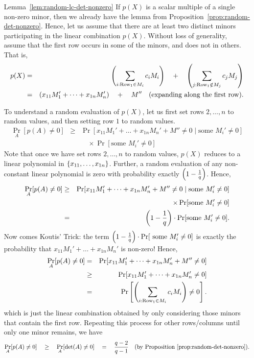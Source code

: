 \documentclass[12pt]{report}
\begin{document}
\begin{proofof}{Lemma~\ref{lem:random-lc-det-nonzero}}
  If $p(X)$ is a scalar multiple of a single non-zero minor, then we
  already have the lemma from
  Proposition~\ref{prop:random-det-nonzero}. Hence, let us assume that
  there are at least two distinct minors participating in the linear
  combination $p(X)$. Without loss of generality, assume that the
  first row occurs in some of the minors, and does not in others. That is, 
  \begin{eqnarray*}
    p(X) &=& \left(\sum_{i:\text{Row}_1\in M_i} c_i M_i\right) \quad+ \quad \left(\sum_{j:\text{Row}_1\notin M_j} c_j M_j\right)\\
     & = & \left(x_{11} M_1' + \dots + x_{1n} M_{n}'\right) \quad+\quad M'' \quad\text{(expanding along the first row)}.
  \end{eqnarray*}
  
  To understand a random evaluation of $p(X)$, let us first set rows $2, \dots, n$ to random values, and
  then setting row $1$ to random values. 
  \begin{eqnarray*}
    \Pr_{A}[p(A)\neq 0] & \geq & \Pr[x_{11} M_1' + \dots + x_{1n} M_n' + M'' \neq 0 \;|\; \text{some }M_{i}'\neq 0]\\
    & & \quad \times \Pr[\text{some }M_i' \neq 0]
  \end{eqnarray*}
  Note that once we have set rows $2,\dots, n$ to random values, $p(X)$ reduces to a linear polynomial in $\left\{x_{11},\dots, x_{1n}\right\}$. Further, a random evaluation of any non-constant linear polynomial is zero with probability exactly $\left(1 -\frac{1}{q}\right)$. Hence, 
  \begin{eqnarray*}
\Pr_{A}[p(A)\neq 0] & \geq & \Pr[x_{11} M_1' + \dots + x_{1n} M_n' + M'' \neq 0 \;|\; \text{some }M_{i}'\neq 0]\\
 & & \quad \times \Pr[\text{some }M_i' \neq 0]\\
    & = & \left(1 - \frac{1}{q}\right)\cdot \Pr[\text{some }M_i' \neq 0].
  \end{eqnarray*}
  Now comes  Koutis' Trick: the term $\left(1 -
    \frac{1}{q}\right) \cdot \Pr[\text{ some }M_i' \neq 0]$ is exactly the
  probability that $x_{11}M_1' + \dots + x_{1n}M_n'$ is non-zero! Hence,
\begin{eqnarray*}
\Pr_{A}[p(A) \neq 0] & = & \Pr[ x_{11}M_1' + \dots + x_{1n} M_n' + M''\neq 0]\\
 & \geq & \Pr[ x_{11}M_1' + \dots + x_{1n} M_n'\neq 0]\\
 & = & \Pr\left[\left(\sum_{i:\text{Row}_1\in M_i} c_i M_i\right) \neq 0\right].
\end{eqnarray*}
which is just the linear combination obtained by only considering
those minors that contain the first row. Repeating this process for other
rows/columns until only  one minor remains, we have
$$
\Pr_{A}[p(A) \neq 0] \quad \geq \quad \Pr_{A}[\det(A) \neq 0] \quad = \quad
\frac{q-2}{q-1}\quad(\text{by Proposition~\ref{prop:random-det-nonzero}}).
$$
\end{proofof}
\end{document}
